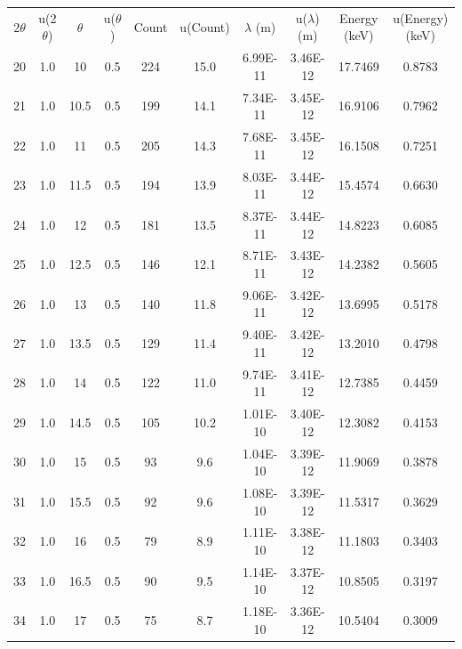 \documentclass[justified]{tufte-book}
\begin{document}
\begin{table}[ht]
\center
\begin{tabular}{cccccccccc}
2$\theta$ & u(2$\theta$) & $\theta$ & u($\theta$) & Count & u(Count) & $\lambda$ (m) & u($\lambda$) (m) & Energy (keV) & u(Energy) (keV) \\
20        & 1.0 & 10       & 0.5         & 224   & 15.0     & 6.99E-11      & 3.46E-12         & 17.7469      & 0.8783 \\
21        & 1.0 & 10.5     & 0.5         & 199   & 14.1     & 7.34E-11      & 3.45E-12         & 16.9106      & 0.7962 \\
22        & 1.0 & 11       & 0.5         & 205   & 14.3     & 7.68E-11      & 3.45E-12         & 16.1508      & 0.7251 \\
23        & 1.0 & 11.5     & 0.5         & 194   & 13.9     & 8.03E-11      & 3.44E-12         & 15.4574      & 0.6630 \\
24        & 1.0 & 12       & 0.5         & 181   & 13.5     & 8.37E-11      & 3.44E-12         & 14.8223      & 0.6085 \\
25        & 1.0 & 12.5     & 0.5         & 146   & 12.1     & 8.71E-11      & 3.43E-12         & 14.2382      & 0.5605 \\
26        & 1.0 & 13       & 0.5         & 140   & 11.8     & 9.06E-11      & 3.42E-12         & 13.6995      & 0.5178 \\
27        & 1.0 & 13.5     & 0.5         & 129   & 11.4     & 9.40E-11      & 3.42E-12         & 13.2010      & 0.4798 \\
28        & 1.0 & 14       & 0.5         & 122   & 11.0     & 9.74E-11      & 3.41E-12         & 12.7385      & 0.4459 \\
29        & 1.0 & 14.5     & 0.5         & 105   & 10.2     & 1.01E-10      & 3.40E-12         & 12.3082      & 0.4153 \\
30        & 1.0 & 15       & 0.5         & 93    & 9.6      & 1.04E-10      & 3.39E-12         & 11.9069      & 0.3878 \\
31        & 1.0 & 15.5     & 0.5         & 92    & 9.6      & 1.08E-10      & 3.39E-12         & 11.5317      & 0.3629 \\
32        & 1.0 & 16       & 0.5         & 79    & 8.9      & 1.11E-10      & 3.38E-12         & 11.1803      & 0.3403 \\
33        & 1.0 & 16.5     & 0.5         & 90    & 9.5      & 1.14E-10      & 3.37E-12         & 10.8505      & 0.3197 \\
34        & 1.0 & 17       & 0.5         & 75    & 8.7      & 1.18E-10      & 3.36E-12         & 10.5404      & 0.3009 \\

\end{tabular}
\end{table}
\end{document}
